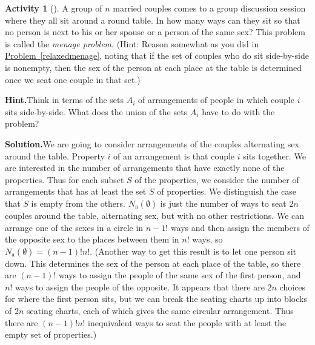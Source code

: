 \documentclass[10pt,]{book}
\theoremstyle{plain}
\theoremstyle{definition}
\newtheorem{activity}[project]{Activity}
\numberwithin{equation}{chapter}
\begin{document}
\begin{activity}[]\label{activity-231}
A group of \(n\) married couples comes to a group discussion session where they all sit around a round table. In how many ways can they sit so that no person is next to his or her spouse or a person of the same sex? This problem is called the \emph{menage problem}. (Hint: Reason somewhat as you did in \hyperref[relaxedmenage]{Problem~\ref{relaxedmenage}}, noting that if the set of couples who do sit side-by-side is nonempty, then the sex of the person at each place at the table is determined once we seat one couple in that set.)%
\par\medskip\noindent%
\textbf{Hint.}\quad Think in terms of the sets \(A_i\) of arrangements of people in which couple \(i\) sits side-by-side. What does the union of the sets \(A_i\) have to do with the problem?%
\par\medskip\noindent%
\textbf{Solution.}\quad We are going to consider arrangements of the couples alternating sex around the table. Property \(i\) of an arrangement is that couple \(i\) sits together. We are interested in the number of arrangements that have exactly none of the properties. Thus for each subset \(S\) of the properties, we consider the number of arrangements that has at least the set \(S\) of properties. We distinguish the case that \(S\) is empty from the others. \(N_{\mbox{a} }(\emptyset)\) is just the number of ways to seat \(2n\) couples around the table, alternating sex, but with no other restrictions. We can arrange one of the sexes in a circle in \(n-1!\) ways and then assign the members of the opposite sex to the places between them in \(n!\) ways, so \(N_{\mbox{a} }(\emptyset) = (n-1)!n!\). (Another way to get this result is to let one person sit down. This determines the sex of the person at each place of the table, so there are \((n-1)!\) ways to assign the people of the same sex of the first person, and \(n!\) ways to assign the people of the opposite. It appears that there are \(2n\) choices for where the first person sits, but we can break the seating charts up into blocks of \(2n\) seating charts, each of which gives the same circular arrangement. Thus there are \((n-1)!n!\) inequivalent ways to seat the people with at least the empty set of properties.)%
\par

\end{activity}
\end{document}

